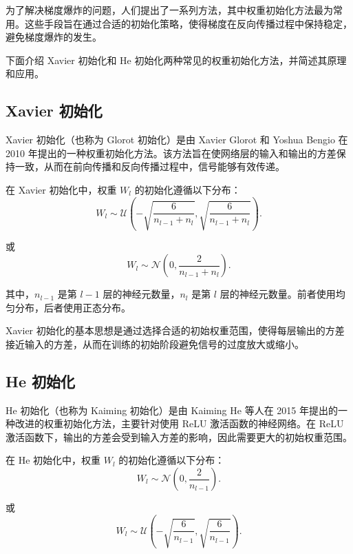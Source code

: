 为了解决梯度爆炸的问题，人们提出了一系列方法，其中权重初始化方法最为常用。这些手段旨在通过合适的初始化策略，使得梯度在反向传播过程中保持稳定，避免梯度爆炸的发生。

下面介绍 Xavier 初始化和 He 初始化两种常见的权重初始化方法，并简述其原理和应用。

\subsection{Xavier 初始化}

Xavier 初始化（也称为 Glorot 初始化）是由 Xavier Glorot 和 Yoshua Bengio 在 2010 年提出的一种权重初始化方法。该方法旨在使网络层的输入和输出的方差保持一致，从而在前向传播和反向传播过程中，信号能够有效传递。

在 Xavier 初始化中，权重 \( W_l \) 的初始化遵循以下分布：
\begin{equation}
  W_l \sim \mathcal{U}\left(-\sqrt{\frac{6}{n_{l-1} + n_l}}, \sqrt{\frac{6}{n_{l-1} + n_l}}\right).
\end{equation}

或
\begin{equation}
  W_l \sim \mathcal{N}\left(0, \frac{2}{n_{l-1} + n_l}\right).
\end{equation}

其中，\( n_{l-1} \) 是第 \( l-1 \) 层的神经元数量，\( n_l \) 是第 \( l \) 层的神经元数量。前者使用均匀分布，后者使用正态分布。

Xavier 初始化的基本思想是通过选择合适的初始权重范围，使得每层输出的方差接近输入的方差，从而在训练的初始阶段避免信号的过度放大或缩小。

\subsection{He 初始化}

He 初始化（也称为 Kaiming 初始化）是由 Kaiming He 等人在 2015 年提出的一种改进的权重初始化方法，主要针对使用 ReLU 激活函数的神经网络。在 ReLU 激活函数下，输出的方差会受到输入方差的影响，因此需要更大的初始权重范围。

在 He 初始化中，权重 \( W_l \) 的初始化遵循以下分布：
\begin{equation}
  W_l \sim \mathcal{N}\left(0, \frac{2}{n_{l-1}}\right).
\end{equation}

或
\begin{equation}
  W_l \sim \mathcal{U}\left(-\sqrt{\frac{6}{n_{l-1}}}, \sqrt{\frac{6}{n_{l-1}}}\right).
\end{equation}

